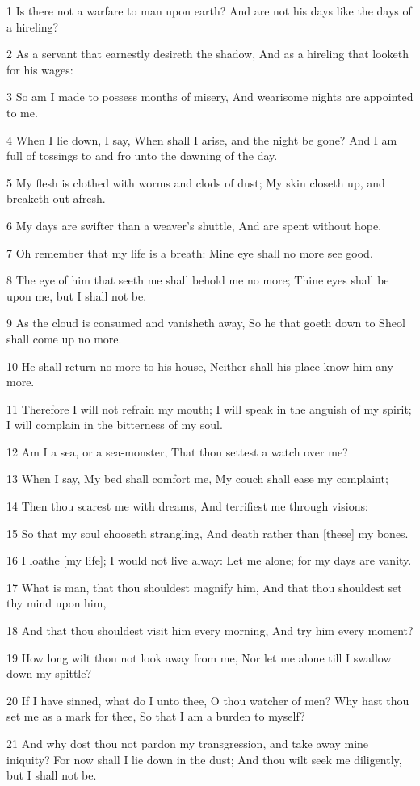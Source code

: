 \par 1 Is there not a warfare to man upon earth? And are not his days like the days of a hireling?
\par 2 As a servant that earnestly desireth the shadow, And as a hireling that looketh for his wages:
\par 3 So am I made to possess months of misery, And wearisome nights are appointed to me.
\par 4 When I lie down, I say, When shall I arise, and the night be gone? And I am full of tossings to and fro unto the dawning of the day.
\par 5 My flesh is clothed with worms and clods of dust; My skin closeth up, and breaketh out afresh.
\par 6 My days are swifter than a weaver's shuttle, And are spent without hope.
\par 7 Oh remember that my life is a breath: Mine eye shall no more see good.
\par 8 The eye of him that seeth me shall behold me no more; Thine eyes shall be upon me, but I shall not be.
\par 9 As the cloud is consumed and vanisheth away, So he that goeth down to Sheol shall come up no more.
\par 10 He shall return no more to his house, Neither shall his place know him any more.
\par 11 Therefore I will not refrain my mouth; I will speak in the anguish of my spirit; I will complain in the bitterness of my soul.
\par 12 Am I a sea, or a sea-monster, That thou settest a watch over me?
\par 13 When I say, My bed shall comfort me, My couch shall ease my complaint;
\par 14 Then thou scarest me with dreams, And terrifiest me through visions:
\par 15 So that my soul chooseth strangling, And death rather than [these] my bones.
\par 16 I loathe [my life]; I would not live alway: Let me alone; for my days are vanity.
\par 17 What is man, that thou shouldest magnify him, And that thou shouldest set thy mind upon him,
\par 18 And that thou shouldest visit him every morning, And try him every moment?
\par 19 How long wilt thou not look away from me, Nor let me alone till I swallow down my spittle?
\par 20 If I have sinned, what do I unto thee, O thou watcher of men? Why hast thou set me as a mark for thee, So that I am a burden to myself?
\par 21 And why dost thou not pardon my transgression, and take away mine iniquity? For now shall I lie down in the dust; And thou wilt seek me diligently, but I shall not be.

